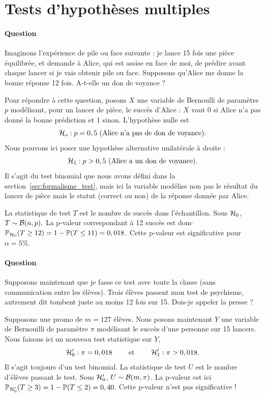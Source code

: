 \section{Tests d'hypothèses multiples}
\label{sec:mht}
\paragraph{Question} Imaginons l'expérience de pile ou face suivante : je lance
15 fois une pièce équilibrée, et demande à Alice, qui est assise en face de
moi, de prédire avant chaque lancer si je vais obtenir pile ou face. Supposons
qu'Alice me donne la bonne réponse 12 fois. A-t-elle un don de
voyance ?
\bigskip

\begin{answer}
	Pour répondre à cette question, posons $X$ une variable de Bernoulli de
	paramètre $p$ modélisant, pour un lancer de pièce, le succès d'Alice :
	$X$ vaut 0 si Alice n'a pas donné la bonne prédiction et 1
	sinon. L'hypothèse nulle est
	\[
	\mathcal{H}_o : p = 0,5 \text{ (Alice n'a pas de don de voyance)}.
	\]
	Nous pouvons ici poser une hypothèse alternative unilatérale à droite :
	\[
	\mathcal{H}_1 : p > 0,5 \text{ (Alice a un don de voyance)}.
	\]
	Il s'agit du test binomial que nous avons défini dans la
	section~\ref{sec:formalisme_test}, mais ici la variable modélise non pas le
	résultat du lancer de pièce mais le statut (correct ou non) de la réponse
	donnée par Alice.
	
	La statistique de test $T$ est le nombre de succès dans l'échantillon. Sous
	$\mathcal{H}_0$, $T \sim \mathcal{B}(n, p).$ La p-valeur correspondant à 12 succès est donc
	$\mathbb{P}_{\mathcal{H}_0}(T \geq 12) = 1 - \mathbb{P}(T \leq 11) = 0,018$. Cette p-valeur est
	significative pour $\alpha = 5\%$.
\end{answer}

\paragraph{Question} Supposons maintenant que je fasse ce test avec toute la
classe (sans communication entre les élèves). Trois élèves passent mon test de
psychisme, autrement dit tombent juste au moins 12 fois sur 15. Dois-je appeler
la presse ?
\bigskip

\begin{answer}
	Supposons une promo de $m=127$ élèves. Nous posons maintenant $Y$ une
	variable de Bernouilli de paramètre $\pi$ modélisant le succès d'une personne
	sur 15 lancers. Nous faisons ici un nouveau test statistique sur $Y$,
	\[
	\mathcal{H}_0^\prime : \pi = 0,018 \text { \qquad et \qquad} \mathcal{H}_1^\prime : \pi >
	0,018.
	\]
	Il s'agit toujours d'un test binomial. La statistique de test $U$ est le
	nombre d'élèves passant le test. Sous $\mathcal{H}_0^\prime$, $U \sim \mathcal{B}(m,
	\pi)$.
	La p-valeur est ici
	$\mathbb{P}_{\mathcal{H}_0^\prime}(T \geq 3) = 1 - \mathbb{P}(T \leq 2) = 0,40.$ Cette p-valeur
	n'est pas significative !
\end{answer}


